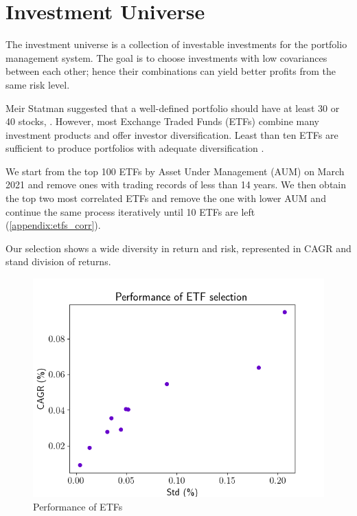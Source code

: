 \section{Investment Universe}
The investment universe is a collection of investable investments for the portfolio management system. The goal is to choose investments with low covariances between each other; hence their combinations can yield better profits from the same risk level\cite{willenbrock2011diversification}. 
\par 
Meir Statman suggested that a well-defined portfolio should have at least 30 or 40 stocks,  \cite{statman1987many}. However, most Exchange Traded Funds (ETFs) combine many investment products and offer investor diversification. Least than ten ETFs are sufficient to produce portfolios with adequate diversification \cite{chang_2016}.
\par
We start from the top 100 ETFs by Asset Under Management (AUM) on March 2021 and remove ones with trading records of less than 14 years. We then obtain the top two most correlated ETFs and remove the one with lower AUM and continue the same process iteratively until 10 ETFs are left (\autoref{appendix:etfs_corr}).
\par
Our selection shows a wide diversity in return and risk, represented in CAGR and stand division of returns.
\begin{figure}[bth]
    \centering
    \includegraphics[width=12cm]{images/etfs.png}
    \caption{Performance of ETFs}
    \label{fig:efts}
\end{figure}